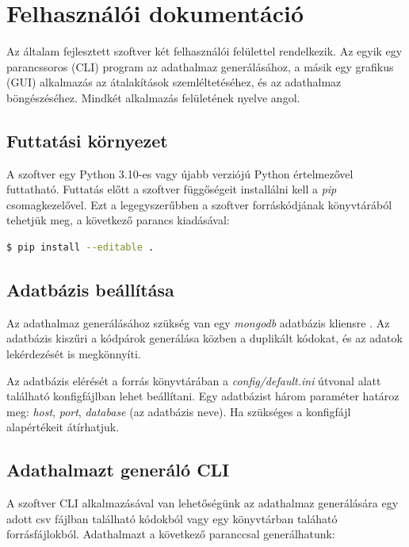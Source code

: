 \chapter{Felhasználói dokumentáció}
\label{ch:user}

Az általam fejlesztett szoftver két felhasználói felülettel rendelkezik.
Az egyik egy parancssoros (CLI) program az adathalmaz generálásához,
a másik egy grafikus (GUI) alkalmazás az átalakítások szemléltetéséhez,
és az adathalmaz böngészéséhez.
Mindkét alkalmazás felületének nyelve angol.

\section{Futtatási környezet}

A szoftver egy Python 3.10-es vagy újabb verziójú Python értelmezővel futtatható.
Futtatás előtt a szoftver függőségeit installálni kell a \emph{pip} csomagkezelővel.
Ezt a legegyszerűbben a szoftver forráskódjának könyvtárából tehetjük meg,
a következő parancs kiadásával:

\begin{lstlisting}[language=bash, numbers=none]
	$ pip install --editable .
\end{lstlisting}

\section{Adatbázis beállítása}

Az adathalmaz generálásához szükség van egy \emph{mongodb} adatbázis kliensre \cite{installMongodb}.
Az adatbázis kiszűri a kódpárok generálása közben a duplikált kódokat,
és az adatok lekérdezését is megkönnyíti.

Az adatbázis elérését a forrás könyvtárában a \emph{config/default.ini} útvonal alatt található
konfigfájlban lehet beállítani.
Egy adatbázist három paraméter határoz meg: \emph{host}, \emph{port}, \emph{database} (az adatbázis neve).
Ha szükséges a konfigfájl alapértékeit átírhatjuk.

\section{Adathalmazt generáló CLI}

A szoftver CLI alkalmazásával van lehetőségünk az adathalmaz generálására egy
adott csv fájlban található kódokból vagy egy könyvtárban taláható forrásfájlokból.
Adathalmazt a következő paranccsal generálhatunk:

